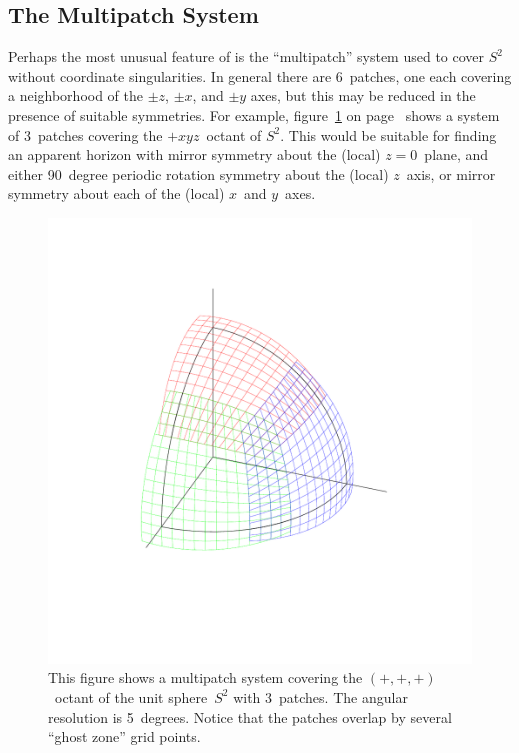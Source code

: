 
\subsection{The Multipatch System}
\label{AHFinderDirect/sect-multipatch-system}

Perhaps the most unusual feature of  is the
``multipatch'' system used to cover $S^2$ without coordinate singularities.
In general there are 6~patches, one each covering a neighborhood of
the $\pm z$, $\pm x$, and $\pm y$ axes, but this may be reduced in
the presence of suitable symmetries.  For example,
figure~\ref{AHFinderDirect/fig-3patch}
on page~\pageref{AHFinderDirect/fig-3patch} shows a system
of 3~patches covering the $+xyz$~octant of $S^2$.  This would be
suitable for finding an apparent horizon with mirror symmetry about
the (local) $z=0$~plane, and either 90~degree periodic rotation symmetry
about the (local) $z$~axis, or mirror symmetry about each of the (local)
$x$~and $y$~axes.

\begin{figure}[htbp]
\begin{center}
\includegraphics{AEIThorns_AHFinderDirect_3patch}
\end{center}
\caption[Illustration of the Multipatch System]
	{
	This figure shows a multipatch system covering the
	$(+,+,+)$~octant of the unit sphere~$S^2$ with 3~patches.
	The angular resolution is 5~degrees.  Notice that the
	patches overlap by several ``ghost zone'' grid points.
	}
\label{AHFinderDirect/fig-3patch}
\end{figure}

